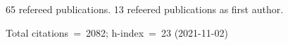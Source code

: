 65 refereed publications. 13 refeered publications as first author.

Total citations~=~2082; h-index~=~23 (2021-11-02)